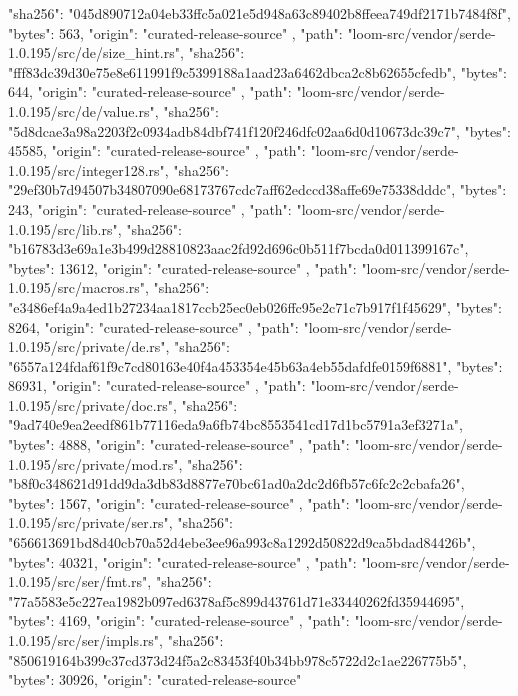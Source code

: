 {{      "sha256": "045d890712a04eb33ffc5a021e5d948a63c89402b8ffeea749df2171b7484f8f",
      "bytes": 563,
      "origin": "curated-release-source"
    },
    {
      "path": "loom-src/vendor/serde-1.0.195/src/de/size_hint.rs",
      "sha256": "fff83dc39d30e75e8e611991f9c5399188a1aad23a6462dbca2c8b62655cfedb",
      "bytes": 644,
      "origin": "curated-release-source"
    },
    {
      "path": "loom-src/vendor/serde-1.0.195/src/de/value.rs",
      "sha256": "5d8dcae3a98a2203f2c0934adb84dbf741f120f246dfc02aa6d0d10673dc39c7",
      "bytes": 45585,
      "origin": "curated-release-source"
    },
    {
      "path": "loom-src/vendor/serde-1.0.195/src/integer128.rs",
      "sha256": "29ef30b7d94507b34807090e68173767cdc7aff62edccd38affe69e75338dddc",
      "bytes": 243,
      "origin": "curated-release-source"
    },
    {
      "path": "loom-src/vendor/serde-1.0.195/src/lib.rs",
      "sha256": "b16783d3e69a1e3b499d28810823aac2fd92d696c0b511f7bcda0d011399167c",
      "bytes": 13612,
      "origin": "curated-release-source"
    },
    {
      "path": "loom-src/vendor/serde-1.0.195/src/macros.rs",
      "sha256": "e3486ef4a9a4ed1b27234aa1817ccb25ec0eb026ffc95e2c71c7b917f1f45629",
      "bytes": 8264,
      "origin": "curated-release-source"
    },
    {
      "path": "loom-src/vendor/serde-1.0.195/src/private/de.rs",
      "sha256": "6557a124fdaf61f9c7cd80163e40f4a453354e45b63a4eb55dafdfe0159f6881",
      "bytes": 86931,
      "origin": "curated-release-source"
    },
    {
      "path": "loom-src/vendor/serde-1.0.195/src/private/doc.rs",
      "sha256": "9ad740e9ea2eedf861b77116eda9a6fb74bc8553541cd17d1bc5791a3ef3271a",
      "bytes": 4888,
      "origin": "curated-release-source"
    },
    {
      "path": "loom-src/vendor/serde-1.0.195/src/private/mod.rs",
      "sha256": "b8f0c348621d91dd9da3db83d8877e70bc61ad0a2dc2d6fb57c6fc2c2cbafa26",
      "bytes": 1567,
      "origin": "curated-release-source"
    },
    {
      "path": "loom-src/vendor/serde-1.0.195/src/private/ser.rs",
      "sha256": "656613691bd8d40cb70a52d4ebe3ee96a993c8a1292d50822d9ca5bdad84426b",
      "bytes": 40321,
      "origin": "curated-release-source"
    },
    {
      "path": "loom-src/vendor/serde-1.0.195/src/ser/fmt.rs",
      "sha256": "77a5583e5c227ea1982b097ed6378af5c899d43761d71e33440262fd35944695",
      "bytes": 4169,
      "origin": "curated-release-source"
    },
    {
      "path": "loom-src/vendor/serde-1.0.195/src/ser/impls.rs",
      "sha256": "850619164b399c37cd373d24f5a2c83453f40b34bb978c5722d2c1ae226775b5",
      "bytes": 30926,
      "origin": "curated-release-source"
}}
